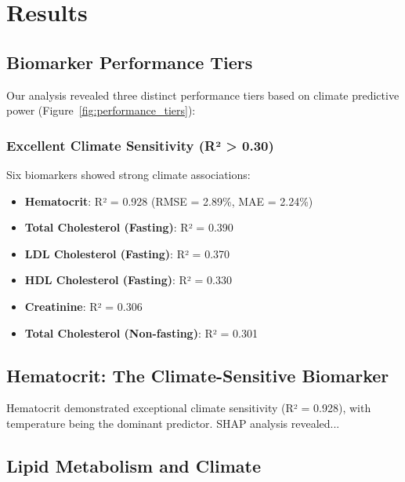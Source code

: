 \documentclass[11pt,a4paper]{article}
\begin{document}




\section{Results}

\subsection{Biomarker Performance Tiers}

Our analysis revealed three distinct performance tiers based on climate predictive power (Figure~\ref{fig:performance_tiers}):

\subsubsection{Excellent Climate Sensitivity (R² > 0.30)}
Six biomarkers showed strong climate associations:
\begin{itemize}
    \item \textbf{Hematocrit}: R² = 0.928 (RMSE = 2.89\%, MAE = 2.24\%)
    \item \textbf{Total Cholesterol (Fasting)}: R² = 0.390
    \item \textbf{LDL Cholesterol (Fasting)}: R² = 0.370
    \item \textbf{HDL Cholesterol (Fasting)}: R² = 0.330
    \item \textbf{Creatinine}: R² = 0.306
    \item \textbf{Total Cholesterol (Non-fasting)}: R² = 0.301
\end{itemize}


\subsection{Hematocrit: The Climate-Sensitive Biomarker}

Hematocrit demonstrated exceptional climate sensitivity (R² = 0.928), with temperature being the dominant predictor. SHAP analysis revealed...

\subsection{Lipid Metabolism and Climate}

\end{document}
